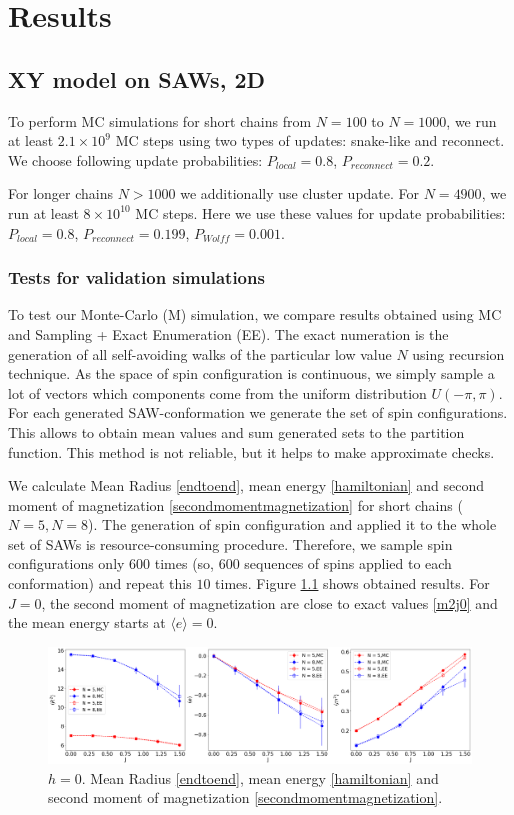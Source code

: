\chapter{Results} \label{ch:results}
 
\section{XY model on SAWs, 2D}
To perform MC simulations for short chains from $N=100$ to $N=1000$, we run at least $2.1 \times 10^9$ MC steps using two  types of updates: snake-like and reconnect. We choose following update probabilities: $P_{local}=0.8$, $P_{reconnect}=0.2$. 

For longer chains $N>1000$ we additionally use cluster update. For $N=4900$, we run at least $8 \times 10^{10} $ MC steps. Here we use these values for update probabilities: $P_{local}=0.8$, $P_{reconnect}=0.199$, $P_{Wolff}=0.001$.

 
\subsection{Tests for validation simulations}
To test our Monte-Carlo (M) simulation, we compare results obtained using MC and Sampling + Exact Enumeration (EE). The exact numeration is the generation of all self-avoiding walks of the particular low value $N$ using recursion technique. As the space of spin configuration is continuous, we simply sample a lot of vectors which components come from the uniform distribution $U(-\pi, \pi)$. For each generated SAW-conformation we generate the set of spin configurations. This allows to obtain mean values and sum generated sets to the partition function. This method is not reliable, but it helps to make approximate checks. 

We calculate Mean Radius \eqref{endtoend}, mean energy \eqref{hamiltonian} and   second moment of magnetization \eqref{secondmomentmagnetization} for short chains ($N=5, N=8$).  The generation of spin configuration and applied it to the whole set of SAWs is resource-consuming procedure. Therefore, we sample spin configurations only $600$ times (so, 600 sequences of spins applied to each conformation) and repeat this $10$ times. Figure \ref{fig:ee} shows obtained results.  For $J=0$, the second moment of magnetization are close to exact values \eqref{m2j0} and the mean energy starts at $\langle e \rangle = 0$.

 \begin{figure}[H]
	\centering
	\includegraphics[scale=0.26]{Images/EE.png}
	\caption{$h=0$. Mean Radius \eqref{endtoend}, mean energy \eqref{hamiltonian} and   second moment of magnetization \eqref{secondmomentmagnetization}.   }
	\label{fig:ee}
\end{figure}


